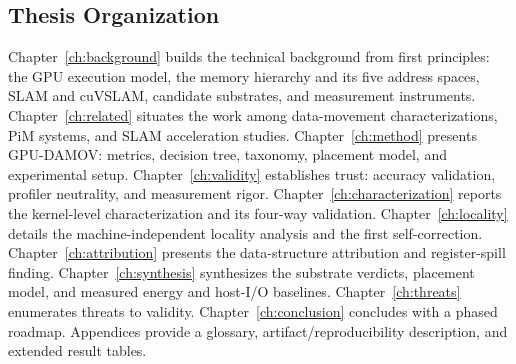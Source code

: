 \subsection{Thesis Organization}
Chapter~\ref{ch:background} builds the technical background from first principles: the GPU execution model, the memory hierarchy and its five address spaces, SLAM and cuVSLAM, candidate substrates, and measurement instruments. Chapter~\ref{ch:related} situates the work among data-movement characterizations, PiM systems, and SLAM acceleration studies. Chapter~\ref{ch:method} presents GPU-DAMOV: metrics, decision tree, taxonomy, placement model, and experimental setup. Chapter~\ref{ch:validity} establishes trust: accuracy validation, profiler neutrality, and measurement rigor. Chapter~\ref{ch:characterization} reports the kernel-level characterization and its four-way validation. Chapter~\ref{ch:locality} details the machine-independent locality analysis and the first self-correction. Chapter~\ref{ch:attribution} presents the data-structure attribution and register-spill finding. Chapter~\ref{ch:synthesis} synthesizes the substrate verdicts, placement model, and measured energy and host-I/O baselines. Chapter~\ref{ch:threats} enumerates threats to validity. Chapter~\ref{ch:conclusion} concludes with a phased roadmap. Appendices provide a glossary, artifact/reproducibility description, and extended result tables.